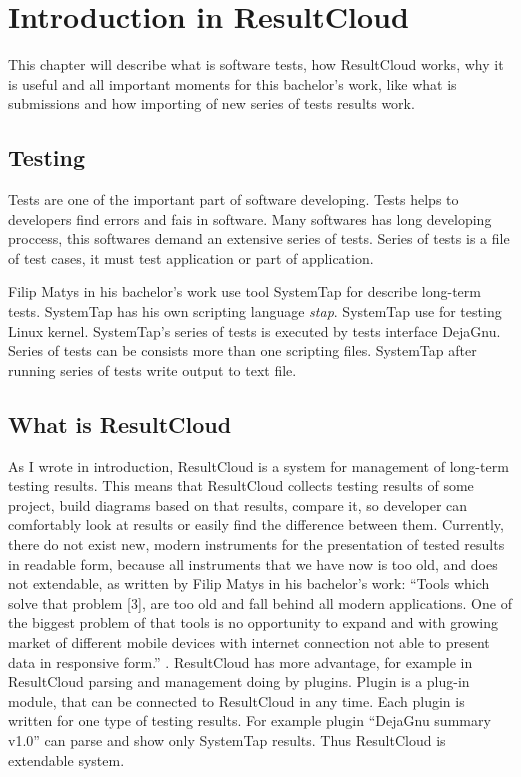 \chapter{Introduction in ResultCloud}
\label{ch:resultcloud}

This chapter will describe what is software tests, how ResultCloud works, why it is useful and all important moments for this bachelor's work, like what is submissions and how importing of new series of tests results work.

\section{Testing}

Tests are one of the important part of software developing. Tests helps to developers find errors and fais in software. Many softwares has long developing proccess, this softwares demand an extensive series of tests. Series of tests is a file of test cases, it must test application or part of application.

Filip Matys in his bachelor's work use tool SystemTap for describe long-term tests. SystemTap has his own scripting language \emph{stap}. SystemTap use for testing Linux kernel. SystemTap's series of tests is executed by tests interface DejaGnu. Series of tests can be consists more than one scripting files. SystemTap after running series of tests write output to text file.  

\section{What is ResultCloud}

As I wrote in introduction, ResultCloud is a system for management of long-term testing results. This means that ResultCloud collects testing results of some project, build diagrams based on that results, compare it, so developer can comfortably look at results or easily find the difference between them. Currently, there do not exist new, modern instruments for the presentation of tested results in readable form, because all instruments that we have now is too old, and does not extendable, as written by Filip Matys in his bachelor's work: “Tools which solve that problem [3], are too old and fall behind all modern applications. One of the biggest problem of that tools is no opportunity to expand and with growing market of different mobile devices with internet connection not able to present data in responsive form.” \cite{filip}. ResultCloud has more advantage, for example in ResultCloud parsing and management doing by plugins. Plugin is a plug-in module, that can be connected to ResultCloud in any time. Each plugin is written for one type of testing results. For example plugin “DejaGnu summary v1.0” can parse and show only SystemTap results. Thus ResultCloud is extendable system.

